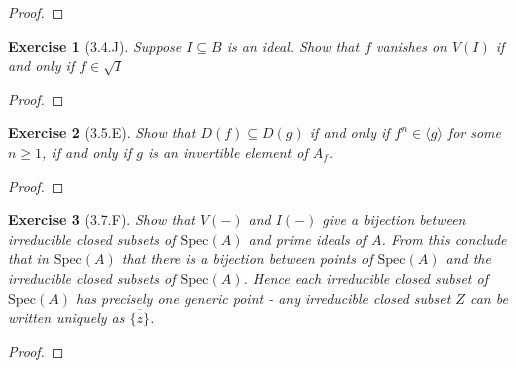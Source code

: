 \documentclass{amsart}
\newtheorem*{exercise*}{Exercise}
\begin{document}
\begin{proof}
	
\end{proof}

\vspace{0.1in}


\begin{exercise*}[3.4.J]
    Suppose $I\subseteq B$ is an ideal. Show that $f$ vanishes on $V(I)$ if and only if $f\in\sqrt{I}$
\end{exercise*}

\vspace{0.1in}

\begin{proof}
	
\end{proof}

\vspace{0.1in}


\begin{exercise*}[3.5.E]
    Show that $D(f)\subseteq D(g)$ if and only if $f^n\in\langle g\rangle$ for some $n\geq 1$, if and only if $g$ is an invertible element of $A_f$.
\end{exercise*}

\vspace{0.1in}

\begin{proof}
	
\end{proof}

\vspace{0.1in}


\begin{exercise*}[3.7.F]
    Show that $V(-)$ and $I(-)$ give a bijection between irreducible closed subsets of $\mathrm{Spec}(A)$ and prime ideals of $A$. From this conclude that in $\mathrm{Spec}(A)$ that there is a bijection between points of $\mathrm{Spec}(A)$ and the irreducible closed subsets of $\mathrm{Spec}(A)$. Hence each irreducible closed subset of $\mathrm{Spec}(A)$ has precisely one generic point - any irreducible closed subset $Z$ can be written uniquely as $\overline{\{z\}}$.
\end{exercise*}

\vspace{0.1in}

\begin{proof}
	
\end{proof}
\end{document}
